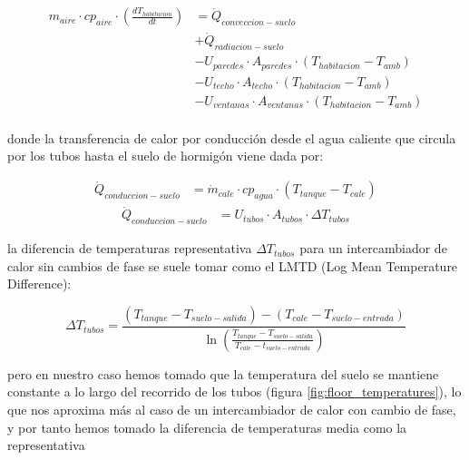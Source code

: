 \begin{align} \label{eq:room_energy_conservation}
	m_{aire} \cdot cp_{aire} \cdot \left( \frac{dT_{habitacion}}{dt} \right) & = \dot{Q}_{conveccion-suelo} \nonumber                                       \\
	                                                                         & + \dot{Q}_{radiacion-suelo} \nonumber                                        \\
	                                                                         & - U_{paredes} \cdot A_{paredes} \cdot (T_{habitacion} - T_{amb}) \nonumber   \\
	                                                                         & - U_{techo} \cdot A_{techo} \cdot (T_{habitacion} - T_{amb}) \nonumber       \\
	                                                                         & - U_{ventanas} \cdot A_{ventanas} \cdot (T_{habitacion} - T_{amb}) \nonumber \\
\end{align}

donde la transferencia de calor por conducción desde el agua caliente que
circula por los tubos hasta el suelo de hormigón viene dada por:

\begin{align}
	\dot{Q}_{conduccion-suelo} & = \dot{m}_{cale} \cdot cp_{agua} \cdot (T_{tanque} - T_{cale})
\end{align}
\begin{align}
	\dot{Q}_{conduccion-suelo} & = U_{tubos} \cdot A_{tubos} \cdot \Delta T_{tubos}
\end{align}

la diferencia de temperaturas representativa $\Delta T_{tubos}$ para un
intercambiador de calor sin cambios de fase se suele tomar como el LMTD (Log
Mean Temperature Difference):

\begin{equation} \label{eq:lmtd}
	\Delta T_{tubos} = \frac{(T_{tanque} - T_{suelo-salida}) - (T_{cale} - T_{suelo-entrada})}{\ln\left(\frac{T_{tanque} - T_{suelo-salida}}{T_{cale} - t_{suelo-entrada} } \right) }
\end{equation}

pero en nuestro caso hemos tomado que la temperatura del suelo se mantiene
constante a lo largo del recorrido de los tubos (figura
\ref{fig:floor_temperatures}), lo que nos aproxima más al caso de un
intercambiador de calor con cambio de fase, y por tanto hemos tomado la
diferencia de temperaturas media como la representativa

